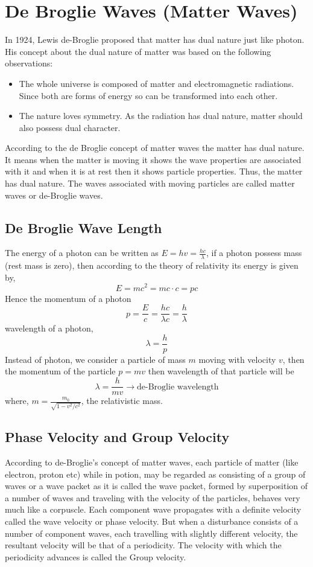\documentclass[../main.tex]{subfiles}
\begin{document}
\chapter{De Broglie Waves (Matter Waves)}
In 1924, Lewis de-Broglie proposed that matter has dual nature just like photon. His concept about the dual nature of matter was based on the following observations:
\begin{itemize}
    \item The whole universe is composed of matter and electromagnetic radiations. Since both are forms of energy so can be transformed into each other.
    \item The nature loves symmetry. As  the radiation has dual nature, matter should also possess dual character.
\end{itemize}
According to the de Broglie concept of matter waves the matter has dual nature. It means when the matter is moving it shows the wave properties are associated with it and when it is at rest then it shows particle properties. Thus, the matter has dual nature. The waves associated with moving particles are called matter waves or de-Broglie waves.
\section{De Broglie Wave Length}
The energy of a photon can be written as $ E=hv=\frac{hc}{\lambda} $, if a photon possess mass (rest mass is zero), then according to the theory of relativity its energy is given by,
\[
    E=mc^2=mc\cdot c=pc
\]
Hence the momentum of a photon
\[
    p=\frac{E}{c}=\frac{hc}{\lambda c}=\frac{h}{\lambda}
\]
wavelength of a photon, 
\[
    \lambda=\frac{h}{p}
\]
Instead of photon, we consider a particle of mass $ m $ moving with velocity $ v $, then the momentum of the particle $ p=mv $ then wavelength of that particle will be
\[
    \boxed{\lambda=\frac{h}{mv}} \longrightarrow \text{de-Broglie wavelength}
\]
where, $\displaystyle m=\frac{m_0}{\sqrt{1-v^2/c^2}} $, the relativistic mass.
\section{Phase Velocity and Group Velocity}
According to de-Broglie's concept of matter waves, each particle of matter (like electron, proton etc) while in potion, may be regarded as consisting of a group of waves or a wave packet as it is called the wave packet, formed by superposition of a number of waves and traveling with the velocity of the particles, behaves very much like a corpuscle. Each component wave propagates with a definite velocity called the wave velocity or phase velocity. But when a disturbance consists of a number of component waves, each travelling with slightly different velocity, the resultant velocity will be that of a periodicity. The velocity with which the periodicity advances is called the Group velocity.
\end{document}
